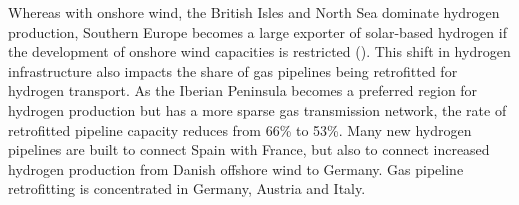 
Whereas with onshore wind, the  British Isles and North Sea dominate hydrogen
production, Southern Europe becomes a large exporter of solar-based hydrogen if
the development of onshore wind capacities is restricted
(). This shift in hydrogen
infrastructure also impacts the share of gas pipelines being retrofitted for
hydrogen transport. As the Iberian Peninsula becomes a preferred region for
hydrogen production but has a more sparse gas transmission network, the rate of
retrofitted pipeline capacity reduces from 66\% to 53\%. Many new hydrogen
pipelines are built to connect Spain with France, but also to connect increased
hydrogen production from Danish offshore wind to Germany. Gas pipeline
retrofitting is concentrated in Germany, Austria and Italy.
